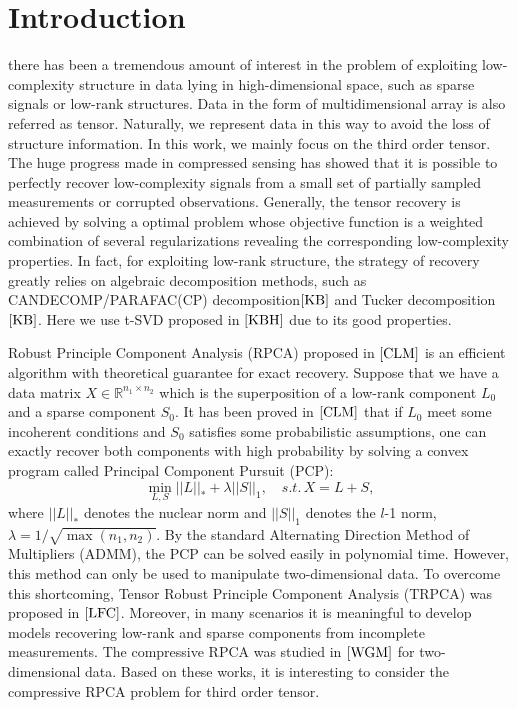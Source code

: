 \documentclass[journal,transmag]{IEEEtran}
\theoremstyle{plain}
\begin{document}
\section{Introduction}
 there has been a tremendous amount of interest in the problem of exploiting low-complexity structure in data lying in high-dimensional space, such as sparse signals or low-rank structures. Data in the form of multidimensional array is also referred as tensor. Naturally, we represent data in this way to avoid the loss of structure information. In this work, we mainly focus on the third order tensor. The huge progress made in compressed sensing has showed that it is possible to perfectly recover low-complexity signals from a small set of partially sampled measurements or corrupted observations. Generally, the tensor recovery is achieved by solving a optimal problem whose objective function is a weighted combination of several regularizations revealing the corresponding low-complexity properties. In fact, for exploiting low-rank structure, the strategy of recovery greatly relies on algebraic decomposition methods, such as CANDECOMP/PARAFAC(CP) decomposition$\cite{KB}$ and Tucker decomposition$\cite{KB}$. Here we use t-SVD proposed in $\cite{KBH}$ due to its good properties.

Robust Principle Component Analysis (RPCA) proposed in $\cite{CLM}$ is an efficient algorithm with theoretical guarantee for exact recovery. Suppose that we have a data matrix $X\in \mathbb{R}^{n_1\times n_2}$ which is the superposition of a low-rank component $L_0$ and a sparse component $S_0$. It has been proved in $\cite{CLM}$ that if $L_0$ meet some incoherent conditions and $S_0$ satisfies some probabilistic assumptions, one can exactly recover both components with high probability by solving a convex program called Principal Component Pursuit (PCP):
\begin{equation}
\min_{L,S}||L||_{*}+\lambda ||S||_1, \quad s.t.\, X=L+S,
\end{equation}
where $||L||_*$ denotes the nuclear norm and $||S||_1$ denotes the $l$-1 norm, $\lambda=1/\sqrt{\max(n_1,n_2)}$. By the standard Alternating Direction Method of Multipliers (ADMM), the PCP can be solved easily in polynomial time. However, this method can only be used to manipulate two-dimensional data. To overcome this shortcoming, Tensor Robust Principle Component Analysis (TRPCA) was proposed in $\cite{LFC}$. Moreover, in many scenarios it is meaningful to develop models recovering low-rank and sparse components from incomplete measurements. The compressive RPCA was studied in $\cite{WGM}$ for two-dimensional data. Based on these works, it is interesting to consider the compressive RPCA problem for third order tensor.
\end{document}
